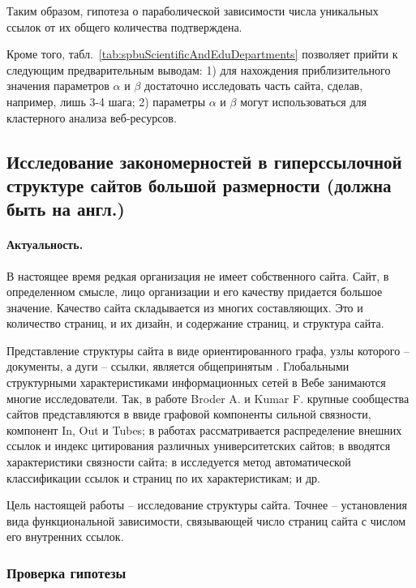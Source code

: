 Таким образом, гипотеза о параболической зависимости числа уникальных ссылок от их общего количества подтверждена.

Кроме того, табл.~\cref{tab:spbuScientificAndEduDepartments} позволяет прийти к следующим предварительным выводам: 1) для нахождения приблизительного значения параметров \(\alpha\) и \(\beta\) достаточно исследовать часть сайта, сделав, например, лишь 3-4 шага; 2) параметры \(\alpha\) и \(\beta\) могут использоваться для кластерного анализа веб-ресурсов.

\subsection{Исследование закономерностей в гиперссылочной структуре сайтов большой размерности (должна быть на англ.)}\label{subsec:ch1/sec4/sub4}

\paragraph{Актуальность.} В настоящее время редкая организация не имеет собственного сайта. Сайт, в определенном смысле, лицо организации и его качеству придается большое значение. Качество сайта складывается из многих составляющих. Это и количество страниц, и их дизайн, и содержание страниц, и структура сайта.

Представление структуры сайта в виде ориентированного графа, узлы которого -- документы, а дуги -- ссылки, является общепринятым \cite{BroderKumarMaghoul}. Глобальными структурными характеристиками информационных сетей в Вебе занимаются многие исследователи. Так, в работе Broder A. и Kumar F. \cite{BroderKumarMaghoul} крупные сообщества сайтов представляются в ввиде графовой компоненты сильной связности, компонент In, Out и Tubes; в работах \cite{Thelwall,ThelwallZuccala,ThelwallWilkinsonMusgrove,PechnikovNwohiri} рассматривается распределение внешних ссылок и индекс цитирования различных университетских сайтов; в \cite{BlekanovSergeevMaksimovBOWTIE} вводятся характеристики связности сайта; в \cite{KenekayoroBuckleyThelwall} исследуется метод автоматической классификации ссылок и страниц по их характеристикам; и др.

Цель настоящей работы – исследование структуры сайта. Точнее – установления вида функциональной зависимости, связывающей число страниц сайта с числом его внутренних ссылок.

\subsubsection{Проверка гипотезы}

